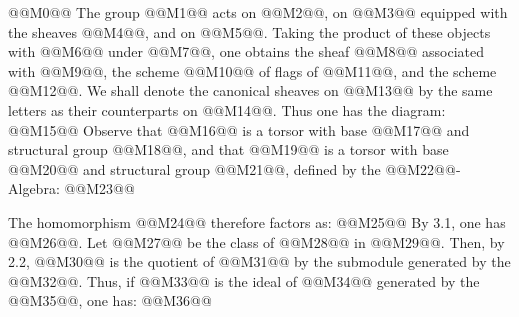 
@@M0@@
The group @@M1@@ acts on @@M2@@, on @@M3@@ equipped with the sheaves @@M4@@, and on @@M5@@. Taking the product of these objects with @@M6@@ under @@M7@@, one obtains the sheaf @@M8@@ associated with @@M9@@, the scheme @@M10@@ of flags of @@M11@@, and the scheme @@M12@@. We shall denote the canonical sheaves on @@M13@@ by the same letters as their counterparts on @@M14@@. Thus one has the diagram:
@@M15@@
Observe that @@M16@@ is a torsor with base @@M17@@ and structural group @@M18@@, and that @@M19@@ is a torsor with base @@M20@@ and structural group @@M21@@, defined by the @@M22@@-Algebra:
@@M23@@

The homomorphism @@M24@@ therefore factors as:
@@M25@@
By 3.1, one has @@M26@@. Let @@M27@@ be the class of @@M28@@ in @@M29@@. Then, by 2.2, @@M30@@ is the quotient of @@M31@@ by the submodule generated by the @@M32@@. Thus, if @@M33@@ is the ideal of @@M34@@ generated by the @@M35@@, one has:
@@M36@@


